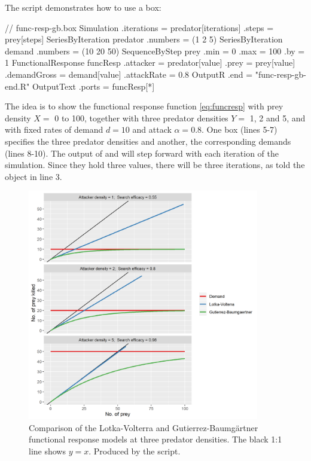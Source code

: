 The  script demonstrates how to use a  box:

\lstset{numbers=left}
\begin{boxscript}
// func-resp-gb.box
Simulation {
  .iterations = predator[iterations]
  .steps = prey[steps]
  SeriesByIteration predator {
    .numbers = (1 2 5)
  }
  SeriesByIteration demand {
    .numbers = (10 20 50)
  }
  SequenceByStep prey {
    .min = 0
    .max = 100
    .by = 1
  }
  FunctionalResponse funcResp {
    .attacker = predator[value]
    .prey = prey[value]
    .demandGross = demand[value]
    .attackRate = 0.8
  }
  OutputR {
    .end = "func-resp-gb-end.R"
    OutputText {
      .ports = funcResp[*]
    }
  }
}\end{boxscript}
\lstset{numbers=none}

The idea is to show the functional response function \eqref{eq:funcresp} with prey density $X=$ 0 to 100, together with three predator densities $Y=$ 1, 2 and 5, and with fixed rates of demand $d=10$ and attack $\alpha=0.8$. One  box (lines 5-7) specifies the three predator densities and another, the corresponding demands (lines 8-10). The  output of  and  will step forward with each iteration of the simulation. Since they hold three values, there will be three iterations, as told the  object in line 3.

\begin{figure} [ht]
\centering
\includegraphics[width=0.9\textwidth]{graphics/func-resp-gb}
\caption{Comparison of the Lotka-Volterra and Gutierrez-Baumg{\"a}rtner functional response models at three predator densities. The black 1:1 line shows $y=x$. Produced by the  script.}
\label{fig:func-resp-gb}
\end{figure}

